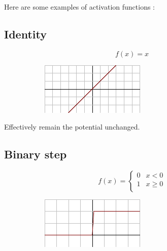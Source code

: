 \noindent
Here are some examples of activation functions \cite{activation_list}:

\subsection*{Identity}

\begin{figure}[H]
\raggedright
\begin{subfigure}{.25\textwidth}
  \centering
  \[ f(x) = x \]
\end{subfigure}%
\begin{subfigure}{.25\textwidth}
  \centering
  \includegraphics[width=\textwidth]{tex/images/activation/identity}
\end{subfigure}
\end{figure}

\noindent
Effectively remain the potential unchanged. 

\subsection*{Binary step}

\begin{figure}[H]
\raggedright
\begin{subfigure}{.35\textwidth}
  \centering
   \[
f(x) = \begin{cases}
       0 & x < 0 \\
       1 & x \geq 0 \\
     \end{cases} \]
\end{subfigure}%
\begin{subfigure}{.25\textwidth}
  \centering
  \includegraphics[width=\textwidth]{tex/images/activation/binstep}
\end{subfigure}
\end{figure}

